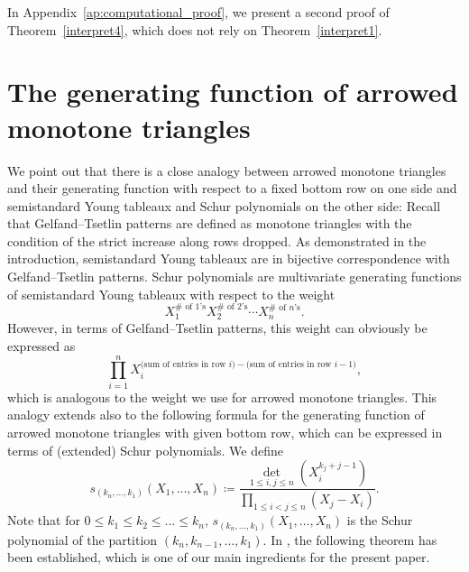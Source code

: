 \documentclass[12pt]{amsart}
\theoremstyle{definition}
\numberwithin{equation}{section}
\begin{document}
In Appendix~\ref{ap:computational_proof}, we present a second proof of Theorem~\ref{interpret4}, which does not rely on Theorem~\ref{interpret1}.


\section{The generating function of arrowed monotone triangles}
\label{sec:AMT} 

We point out that there is a close analogy between arrowed monotone triangles and their generating function with respect to a fixed bottom row on one side and  semistandard Young tableaux and Schur polynomials on the other side: Recall that Gelfand--Tsetlin patterns are defined as monotone triangles with the condition of the strict increase along rows dropped. As demonstrated in the introduction, semistandard Young tableaux are in bijective correspondence with Gelfand--Tsetlin patterns. Schur polynomials are multivariate generating functions of semistandard Young tableaux with respect to the weight 
\begin{equation*}
X_1^{\text{$\#$ of $1$'s}} X_2^{\text{$\#$ of $2$'s}} \cdots X_n^{\text{$\#$ of $n$'s}}.
\end{equation*}
However, in terms of Gelfand--Tsetlin patterns, this weight can obviously be expressed as 
\begin{equation*}
\prod_{i=1}^n X_i^{\text{(sum of entries in row $i$)}-\text{(sum of entries in row $i-1$)}},
\end{equation*}
which is analogous to the weight we use for arrowed monotone triangles.
This analogy extends also to the following formula for the generating function of arrowed monotone triangles with given 
bottom row, which can be expressed in terms of (extended) Schur polynomials. We define 
\begin{equation*} 
s_{(k_n,\ldots,k_1)}(X_1,\ldots,X_n) \coloneq 
\frac{\det_{1 \le i,j \le n} \left( X_i^{k_j+j-1} \right)}{\prod_{1 \le i < j \le n} (X_j-X_i)}.
\end{equation*} 
Note that for $0 \le k_1 \le k_2 \le \ldots \le k_n$, $s_{(k_n,\ldots,k_1)}(X_1,\ldots,X_n)$ is the Schur polynomial of the partition $(k_n,k_{n-1},\ldots,k_1)$. In \cite[Theorem 2.2]{nASMDPP}, the following theorem has been established, which is one of our main ingredients for the present paper.
\end{document}
